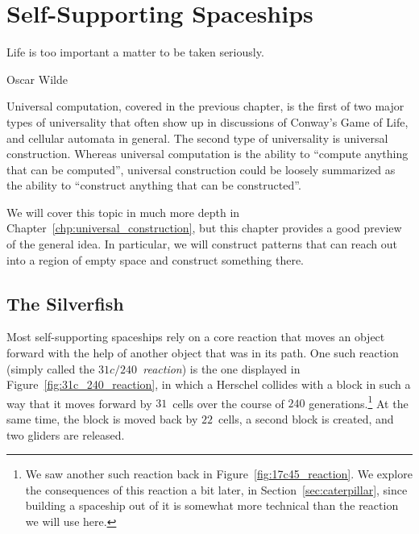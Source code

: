 
\renewcommand{\chapterfolder}{self_support_spaceships/}
\chapter{Self-Supporting Spaceships}\label{chp:self_support_spaceships}


\vspace*{-0.4in}
\epigraph{Life is too important a matter to be taken seriously.}{Oscar Wilde}
\vspace*{0.4in}


\noindent Universal computation, covered in the previous chapter, is the first of two major types of universality that often show up in discussions of Conway's Game of Life, and cellular automata in general. The second type of universality is universal construction. Whereas universal computation is the ability to ``compute anything that can be computed'', universal construction could be loosely summarized as the ability to ``construct anything that can be constructed''.

We will cover this topic in much more depth in Chapter~\ref{chp:universal_construction}, but this chapter provides a good preview of the general idea. In particular, we will construct patterns that can reach out into a region of empty space and construct something there.


\section{The Silverfish}\label{sec:silverfish}

Most self-supporting spaceships rely on a core reaction that moves an object forward with the help of another object that was in its path. One such reaction (simply called the \emph{$31c/240$~reaction}) is the one displayed in Figure~\ref{fig:31c_240_reaction}, in which a Herschel collides with a block in such a way that it moves forward by $31$~cells over the course of $240$ generations.\footnote{We saw another such reaction back in Figure~\ref{fig:17c45_reaction}. We explore the consequences of this reaction a bit later, in Section~\ref{sec:caterpillar}, since building a spaceship out of it is somewhat more technical than the reaction we will use here.} At the same time, the block is moved back by $22$~cells, a second block is created, and two gliders are released.

